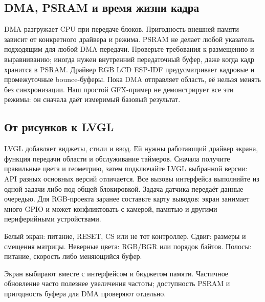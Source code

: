 \subsection{DMA, PSRAM и время жизни кадра}
DMA разгружает CPU при передаче блоков. Пригодность внешней памяти зависит от конкретного
драйвера и режима. PSRAM не делает любой указатель подходящим для любой DMA-передачи.
Проверьте требования к размещению и выравниванию; иногда нужен внутренний передаточный буфер,
даже когда кадр хранится в PSRAM. Драйвер RGB LCD ESP-IDF предусматривает кадровые и
промежуточные bounce-буферы. Пока DMA отправляет область, её нельзя менять без синхронизации.
Наш простой GFX-пример не демонстрирует все эти режимы: он сначала даёт измеримый базовый результат.

\subsection{От рисунков к LVGL}
LVGL добавляет виджеты, стили и ввод. Ей нужны работающий драйвер экрана, функция передачи области
и обслуживание таймеров. Сначала получите правильные цвета и геометрию, затем подключайте LVGL
выбранной версии: API разных основных версий отличается. Все вызовы интерфейса выполняйте
из одной задачи либо под общей блокировкой. Задача датчика передаёт данные очередью.
Для RGB-проекта заранее составьте карту выводов: экран занимает много GPIO и может конфликтовать
с камерой, памятью и другими периферийными устройствами.

\begin{trouble}
Белый экран: питание, RESET, CS или не тот контроллер. Сдвиг: размеры и смещения матрицы.
Неверные цвета: RGB/BGR или порядок байтов. Полосы: питание, скорость либо меняющийся буфер.
\end{trouble}
\begin{summary}
Экран выбирают вместе с интерфейсом и бюджетом памяти. Частичное обновление часто полезнее
увеличения частоты; доступность PSRAM и пригодность буфера для DMA проверяют отдельно.
\end{summary}

